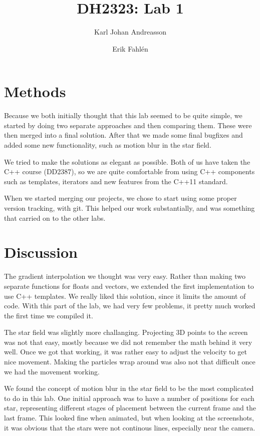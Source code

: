 \documentclass[a4paper]{article}
\begin{document}
\title{DH2323: Lab 1}
\author{Karl Johan Andreasson \and Erik Fahlén}

\maketitle
\clearpage

\section{Methods}
Because we both initially thought that this lab seemed to be quite simple, we started by doing two separate approaches and then comparing them.
These were then merged into a final solution.
After that we made some final bugfixes and added some new functionality, such as motion blur in the star field.

We tried to make the solutions as elegant as possible.
Both of us have taken the C++ course (DD2387), so we are quite comfortable from using C++ components such as templates, iterators and new features from the C++11 standard.

When we started merging our projects, we chose to start using some proper version tracking, with git.
This helped our work substantially, and was something that carried on to the other labs.

\section{Discussion}
The gradient interpolation we thought was very easy.
Rather than making two separate functions for floats and vectors, we extended the first implementation to use C++ templates.
We really liked this solution, since it limits the amount of code.
With this part of the lab, we had very few problems, it pretty much worked the first time we compiled it.

The star field was slightly more challanging.
Projecting 3D points to the screen was not that easy, mostly because we did not remember the math behind it very well.
Once we got that working, it was rather easy to adjust the velocity to get nice movement.
Making the particles wrap around was also not that difficult once we had the movement working.

We found the concept of motion blur in the star field to be the most complicated to do in this lab.
One initial approach was to have a number of positions for each star, representing different stages of placement between the current frame and the last frame.
This looked fine when animated, but when looking at the screenshots, it was obvious that the stars were not continous lines, especially near the camera.
\end{document}
